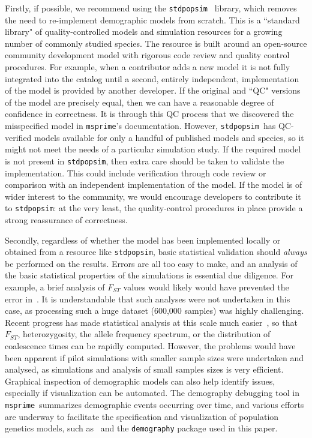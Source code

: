 \documentclass{article}
\newcommand{\msprime}[0]{\texttt{msprime}}
\newcommand{\stdpopsim}[0]{\texttt{stdpopsim}}
\begin{document}
Firstly, if possible, we recommend using the \stdpopsim~\citep{adrion2019community}
library, which removes the need to re-implement demographic models from scratch.
This is a ``standard library" of quality-controlled
models and simulation resources for a growing number of commonly studied species.
The resource is built around an open-source community development model
with rigorous code review and quality control procedures.
For example, when a contributor adds a new model it is not fully integrated
into the catalog until a second, entirely independent, implementation of the
model is provided by another developer. If the original and ``QC" versions
of the model are precisely equal, then we can have a reasonable degree
of confidence in correctness. It is through this QC process that we discovered
the misspecified model in \msprime's documentation.
However, \stdpopsim\ has QC-verified models available for only a handful of published
models and species, so it might not meet the needs of a particular simulation study.
If the required model is not present in \stdpopsim, then extra care should
be taken to validate the implementation.
This could include verification through code review or comparison with an
independent implementation of the model. If the model is of wider interest to
the community, we would encourage developers to contribute it to \stdpopsim:
at the very least, the quality-control procedures in place provide a strong
reassurance of correctness.

Secondly, regardless of whether the model has been implemented
locally or obtained from a resource like \stdpopsim,
basic statistical validation should \emph{always} be performed on the
results. Errors are all too easy to make, and an analysis of the
basic statistical properties of the simulations is essential
due diligence. For example, a brief analysis of $F_{ST}$ values
would likely would have prevented the error in~\citet{martin2017human}.
It is understandable that such analyses were not undertaken in this
case, as processing such a huge dataset (600,000 samples) was
highly challenging. Recent progress has made statistical analysis at this scale much
easier~\citep{ralph2020efficiently}, so that $F_{ST}$,
heterozygosity, the allele frequency spectrum, or the distribution of coalescence
times can be rapidly computed. However, the problems would have been
apparent if pilot simulations with smaller sample sizes were undertaken and analysed,
as simulations and analysis of small samples sizes is very efficient.
Graphical inspection of demographic models can also help identify issues, especially if
visualization can be automated. The demography debugging tool in \msprime\
summarizes demographic events occurring over time, and various efforts are underway to facilitate
the specification and visualization of population genetics models, such as~\citet{zhou2018popdemog}
and the \texttt{demography} package used in this paper.
\end{document}
